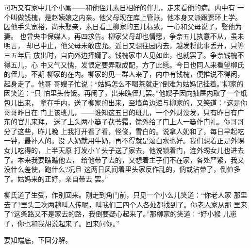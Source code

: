 可巧又有家中几个小厮——和他侄儿素日相好的伴儿，走来看他的病。内中有
一个叫做钱槐，是赵姨娘之内亲。他父母现在库上管账，他本身又派跟贾环上学。
因他手头宽裕，尚未娶亲，素日看上柳家的五儿标致，一心和父母说了，娶他为妻。
也曾央中保媒人，再四求告。柳家父母却也情愿，争奈五儿执意不从，虽未明言，
却已中止，他父母未敢应允。近日又想往园内去，越发将此事丢开，只等三五年后
放出时，自向外边择婿了。钱槐家中人见如此，也就罢了。争奈钱槐不得五儿，心
中又气又愧，发恨定要弄取成配，方了此愿。今日也同人来看望柳氏的侄儿，不期
柳家的在内。柳家的见一群人来了，内中有钱槐，便推说不得闲，起身走了。他哥
哥嫂子忙说：“姑妈怎么不喝茶就走?倒难为姑妈记挂着。”柳家的因笑道：“只
怕里头传饭。再闲了，出来瞧侄儿罢。”他嫂子因向抽屉内取了一个纸包儿出来，
拿在手内，送了柳家的出来，至墙角边递与柳家的，又笑道：“这是你哥哥昨日在
门上该班儿，——谁知这五日的班儿，一个外财没发，只有昨日有广东的官儿来拜，
送了上头两小篓子茯苓霜，馀外给了门上人一篓作门礼。你哥哥分了这些，昨儿晚
上我打开看了看，怪俊，雪白的。说拿人奶和了，每日早起吃一钟，最补人的。没
人奶就用牛奶，再不得就是滚白水也好。我们想着正是外甥女儿吃得的，上半天原
打发小丫头子送了家去，他说锁着门，连外甥女儿也进去了。本来我要瞧瞧他去，
给他带了去的，又想着主子们不在家，各处严紧，我又没什么差使，跑什么?况且
这两日风闻着里头家反作乱的，倘或沾带了，倒值多了。姑妈来的正好，亲自带去
罢。”

柳氏道了生受，作别回来。刚走到角门前，只见一个小么儿笑道：“你老人家
那里去了?里头三次两趟叫人传呢，叫我们三四个人各处都找到了。你老人家从那
里来了?这条路又不是家去的路，我倒要疑心起来了。”那柳家的笑道：“好小猴
儿崽子，你也和我胡说起来了。回来问你。”

要知端底，下回分解。